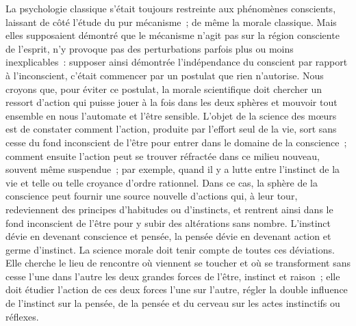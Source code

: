 \documentclass[french,twoside]{book} %
\begin{document}
La psychologie classique s’était toujours restreinte aux phénomènes conscients, laissant de côté l’étude du pur mécanisme ; de même la morale classique. Mais elles supposaient démontré que le mécanisme n’agit pas sur la région consciente de l’esprit, n’y provoque pas des perturbations parfois plus ou moins inexplicables : supposer ainsi démontrée l’indépendance du conscient par rapport à l’inconscient, c’était commencer par un postulat que rien n’autorise. Nous croyons que, pour éviter ce postulat, la morale scientifique doit chercher un ressort d’action qui puisse jouer à la fois dans les deux sphères et mouvoir tout ensemble en nous l’automate et l’être sensible. L’objet de la science des mœurs est de constater comment l’action, produite par l’effort seul de la vie, sort sans cesse du fond inconscient de l’être pour entrer dans le domaine de la conscience ; comment ensuite l’action peut se trouver réfractée dans ce milieu nouveau, souvent même suspendue ; par exemple, quand il y a lutte entre l’instinct de la vie et telle ou telle croyance d’ordre rationnel. Dans ce cas, la sphère de la conscience peut fournir une source nouvelle d’actions qui, à leur tour, redeviennent des principes d’habitudes ou d’instincts, et rentrent ainsi dans le fond inconscient de l’être pour y subir des altérations sans nombre. L’instinct dévie en devenant conscience et pensée, la pensée dévie en devenant action et germe d’instinct. La science morale doit tenir compte de toutes ces déviations. Elle cherche le lieu de rencontre où viennent se toucher et où se transforment sans cesse l’une dans l’autre les deux grandes forces de l’être, instinct et raison ; elle doit étudier l’action de ces deux forces l’une sur l’autre, régler la double influence de l’instinct sur la pensée, de la pensée et du cerveau sur les actes instinctifs ou réflexes.\par
\end{document}
